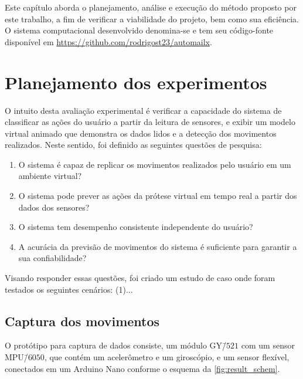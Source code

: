 Este capítulo aborda o planejamento, análise e execução do método proposto por este trabalho, a fim de verificar a viabilidade do projeto, bem como sua eficiência. O sistema computacional desenvolvido denomina-se \productname{} e tem seu código-fonte disponível em \url{https://github.com/rodrigost23/automailx}.


\section{Planejamento dos experimentos}\label{sec:result_planejamento}

O intuito desta avaliação experimental é verificar a capacidade do sistema \productname{} de classificar as ações do usuário a partir da leitura de sensores, e exibir um modelo virtual animado que demonstra os dados lidos e a detecção dos movimentos realizados. Neste sentido, foi
definido as seguintes questões de pesquisa:

\begin{enumerate}[label=\textbf{QP\arabic*:}, ref=QP\arabic*]
    \item O sistema \productname{} é capaz de replicar os movimentos realizados pelo usuário em um ambiente virtual?\label{qp:simula_movimentos}
    \item O sistema \productname{} pode prever as ações da prótese virtual em tempo real a partir dos dados dos sensores?\label{qp:previsao_sensores}
    \item O sistema \productname{} tem desempenho consistente independente do usuário?\label{qp:usuarios_diferentes}
    \item A acurácia da previsão de movimentos do sistema \productname{} é suficiente para garantir a sua confiabilidade?\label{qp:acuracia}
\end{enumerate}
Visando responder essas questões, foi criado um estudo de caso onde foram testados os seguintes cenários: (1)...


\subsection{Captura dos movimentos}\label{sec:result_captura}

O protótipo para captura de dados consiste, um módulo GY\=/$521$ com um sensor MPU\=/$6050$, que contém um acelerômetro e um giroscópio, e um sensor flexível, conectados em um Arduino Nano conforme o esquema da \autoref{fig:result_schem}.

